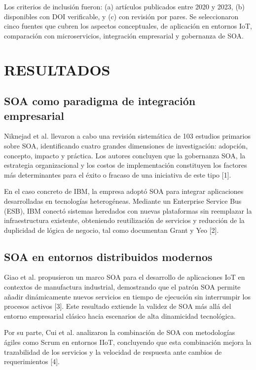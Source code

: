 \documentclass[conference]{IEEEtran}
\begin{document}
Los criterios de inclusión fueron: (a) artículos publicados entre 2020 y 2023, (b) disponibles con DOI verificable, y (c) con revisión por pares. Se seleccionaron cinco fuentes que cubren los aspectos conceptuales, de aplicación en entornos IoT, comparación con microservicios, integración empresarial y gobernanza de SOA.

\section{RESULTADOS}

\subsection{SOA como paradigma de integración empresarial}

Niknejad et al. llevaron a cabo una revisión sistemática de 103 estudios primarios sobre SOA, identificando cuatro grandes dimensiones de investigación: adopción, concepto, impacto y práctica. Los autores concluyen que la gobernanza SOA, la estrategia organizacional y los costos de implementación constituyen los factores más determinantes para el éxito o fracaso de una iniciativa de este tipo [1].

En el caso concreto de IBM, la empresa adoptó SOA para integrar aplicaciones desarrolladas en tecnologías heterogéneas. Mediante un Enterprise Service Bus (ESB), IBM conectó sistemas heredados con nuevas plataformas sin reemplazar la infraestructura existente, obteniendo reutilización de servicios y reducción de la duplicidad de lógica de negocio, tal como documentan Grant y Yeo [2].

\subsection{SOA en entornos distribuidos modernos}

Giao et al. propusieron un marco SOA para el desarrollo de aplicaciones IoT en contextos de manufactura industrial, demostrando que el patrón SOA permite añadir dinámicamente nuevos servicios en tiempo de ejecución sin interrumpir los procesos activos [3]. Este resultado extiende la validez de SOA más allá del entorno empresarial clásico hacia escenarios de alta dinamicidad tecnológica.

Por su parte, Cui et al. analizaron la combinación de SOA con metodologías ágiles como Scrum en entornos IIoT, concluyendo que esta combinación mejora la trazabilidad de los servicios y la velocidad de respuesta ante cambios de requerimientos [4].
\end{document}
